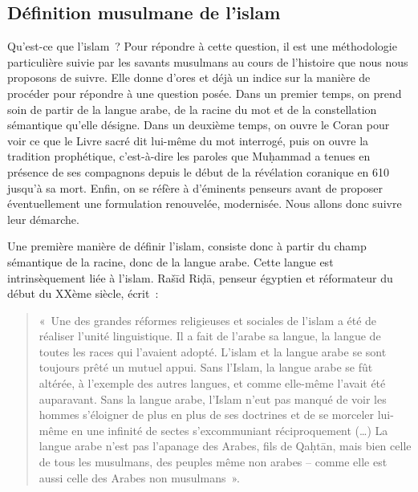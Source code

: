 \subsection{Définition musulmane de l'islam
}
\label{duxe9finition-musulmane-de-lislam}

Qu'est-ce que l'islam~? Pour répondre à cette question, il est une
méthodologie particulière suivie par les savants musulmans au cours de
l'histoire que nous nous proposons de suivre. Elle donne d'ores et déjà
un indice sur la manière de procéder pour répondre à une question posée.
Dans un premier temps, on prend soin de partir de la langue arabe, de la
racine du mot et de la constellation sémantique qu'elle désigne. Dans un
deuxième temps, on ouvre le Coran pour voir ce que le Livre sacré dit
lui-même du mot interrogé, puis on ouvre la tradition prophétique,
c'est-à-dire les paroles que Muḥammad a tenues en présence de ses
compagnons depuis le début de la révélation coranique en 610 jusqu'à sa
mort. Enfin, on se réfère à d'éminents penseurs avant de proposer
éventuellement une formulation renouvelée, modernisée. Nous allons donc
suivre leur démarche.

Une première manière de définir l'islam, consiste donc à partir du champ
sémantique de la racine, donc de la langue arabe. Cette langue est
intrinsèquement liée à l'islam. Rašīd Riḍā, penseur égyptien et
réformateur du début du XXème siècle, écrit~:

\begin{quote}
«~Une des grandes réformes religieuses et sociales de l'islam a été de
réaliser l'unité linguistique. Il a fait de l'arabe sa langue, la langue
de toutes les races qui l'avaient adopté. L'islam et la langue arabe se
sont toujours prêté un mutuel appui. Sans l'Islam, la langue arabe se
fût altérée, à l'exemple des autres langues, et comme elle-même l'avait
été auparavant. Sans la langue arabe, l'Islam n'eut pas manqué de voir
les hommes s'éloigner de plus en plus de ses doctrines et de se morceler
lui-même en une infinité de sectes s'excommuniant réciproquement
(\ldots) La langue arabe n'est pas l'apanage des Arabes, fils de Qaḥtān,
mais bien celle de tous les musulmans, des peuples même non arabes --
comme elle est aussi celle des Arabes non musulmans~».
\end{quote}

